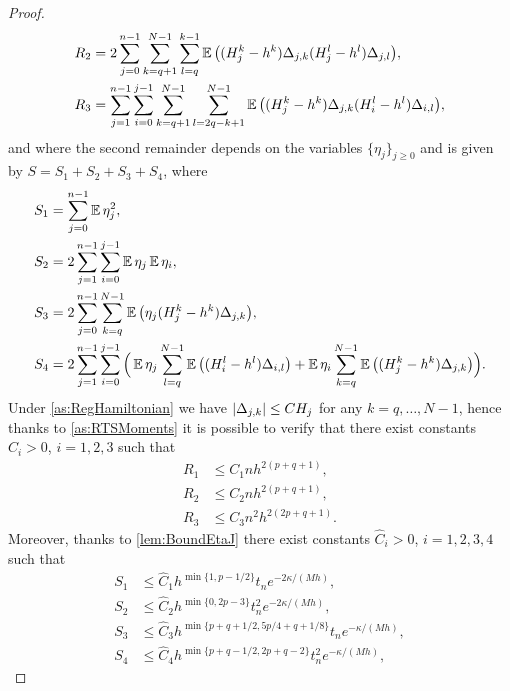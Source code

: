 \documentclass[10pt]{article}
\begin{document}
\begin{proof}
\begin{equation}
\begin{aligned}
	R_2 &= 2\sum_{j=0}^{n-1} \sum_{k=q+1}^{N-1} \sum_{l=q}^{k-1} \operatorname{\mathbb{E}} \big((H_j^k - h^k)\Delta_{j,k}(H_j^l - h^l) \Delta_{j,l}\big),\\
	R_3 &= \sum_{j=1}^{n-1}\sum_{i=0}^{j-1} \sum_{k=q+1}^{N-1}\sum_{l=2q-k+1}^{N-1} \operatorname{\mathbb{E}}\big((H_j^k - h^k)\Delta_{j,k}(H_i^l - h^l) \Delta_{i,l}\big),
	\end{aligned}
	\end{equation}	
	and where the second remainder depends on the variables $\{\eta_j\}_{j\geq0}$ and is given by $S = S_1 + S_2 + S_3 + S_4$, where
	\begin{equation}
	\begin{aligned}
		S_1 &= \sum_{j=0}^{n-1} \operatorname{\mathbb{E}} \eta_j^2, \\
		S_2 &= 2 \sum_{j=1}^{n-1}\sum_{i=0}^{j-1}\operatorname{\mathbb{E}}\eta_j\operatorname{\mathbb{E}}\eta_i, \\
		S_3 &= 2\sum_{j=0}^{n-1}\sum_{k=q}^{N-1} \operatorname{\mathbb{E}}\big(\eta_j(H_j^k - h^k) \Delta_{j,k}\big),\\
		S_4 &= 2 \sum_{j=1}^{n-1}\sum_{i=0}^{j-1} \Big(\operatorname{\mathbb{E}}\eta_j\sum_{l=q}^{N-1}\operatorname{\mathbb{E}}\big((H_i^l - h^l)\Delta_{i,l}\big) + \operatorname{\mathbb{E}}\eta_i\sum_{k=q}^{N-1}\operatorname{\mathbb{E}}\big((H_j^k - h^k) \Delta_{j,k}\big)\Big).
	\end{aligned}
	\end{equation}
	Under \cref{as:RegHamiltonian} we have $\lvert\Delta_{j,k}\rvert \leq CH_j$ for any $k = q, \ldots, N-1$, hence thanks to \cref{as:RTSMoments} it is possible to verify that there exist constants $C_i > 0$, $i = 1, 2, 3$ such that
	\begin{equation}
	\begin{aligned}
	R_1 &\leq C_1nh^{2(p+q+1)}, \\
	R_2 &\leq C_2nh^{2(p+q+1)}, \\
	R_3 &\leq C_3n^2h^{2(2p+q+1)}.
	\end{aligned}
	\end{equation}
	Moreover, thanks to \cref{lem:BoundEtaJ} there exist constants $\widehat C_i > 0$, $i = 1, 2, 3, 4$ such that
	\begin{equation}
	\begin{aligned}
		S_1 &\leq \widehat C_1 h^{\min\{1, p-1/2\}} t_n e^{-2\kappa/(Mh)}, \\
		S_2 &\leq \widehat C_2 h^{\min\{0, 2p-3\}} t_n^2 e^{-2\kappa/(Mh)}, \\
		S_3 &\leq \widehat C_3 h^{\min\{p+q+1/2, 5p/4 + q + 1/8\}} t_n e^{-\kappa/(Mh)}, \\
		S_4 &\leq \widehat C_4 h^{\min\{p+q-1/2, 2p + q - 2\}} t_n^2 e^{-\kappa/(Mh)},
	\end{aligned}

\end{equation}
\end{proof}
\end{document}
